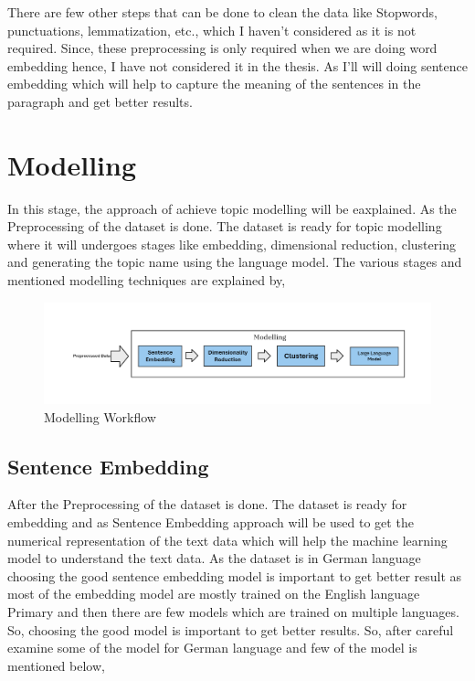 There are few other steps that can be done to clean the data like Stopwords, punctuations, lemmatization, etc., which I haven't 
considered as it is not required. Since, these preprocessing is only required when we are doing word embedding hence, I have not 
considered it in the thesis. As I'll will doing sentence embedding which will help to capture the meaning of the sentences in 
the paragraph and get better results.


\section{Modelling}
In this stage, the approach of achieve topic modelling will be eaxplained. As the Preprocessing of the dataset is done. 
The dataset is ready for topic modelling where it will undergoes stages like embedding,
 dimensional reduction, clustering and generating the topic name using the language model. The various stages and mentioned 
 modelling techniques are explained by,
 \begin{figure}[htbp]
    \begin{center}
      \includegraphics[width=16cm]{./Images/Modelling Workflow.png}
       \caption{Modelling Workflow}
       \label{fig: Modelling Workflow}
    \end{center}
    \end{figure}
\subsection{Sentence Embedding}

After the Preprocessing of the dataset is done. The dataset is ready for embedding and as Sentence Embedding approach will 
be used to get the numerical representation of the text data which will help the machine learning model to understand the text data.
As the dataset is in German language choosing the good sentence embedding model is important to get better result as most of the 
embedding model are mostly trained on the English language Primary and then there are few models which are trained on multiple 
languages. So, choosing the good model is important to get better results. So, after careful examine some of the model for 
German language and few of the model is mentioned below,

